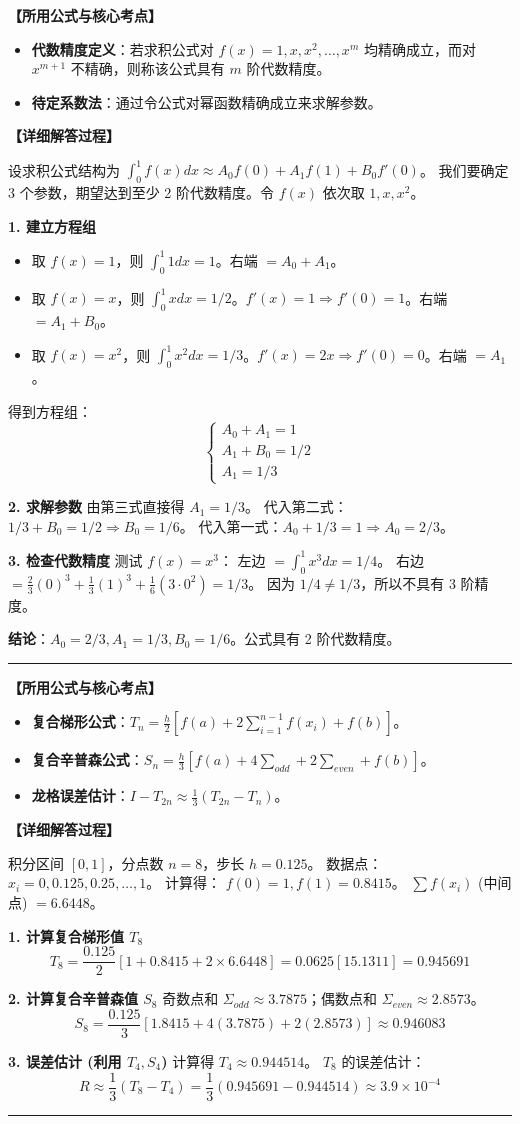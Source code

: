 \documentclass[a4paper,12pt]{ctexart}
\newcommand{\solitem}[3]{
    \vspace{1.5em}
    \begin{tcolorbox}[colback=gray!5!white, colframe=gray!50!black, title=\textbf{题目 #1}]
    \end{tcolorbox}
    
    \noindent\textbf{【所用公式与核心考点】}
    \begin{itemize}[leftmargin=2em, label=$\diamond$]
        #2
    \end{itemize}
    
    \noindent\textbf{【详细解答过程】}
    \par
    #3
    \par
    \vspace{1em}
    \hrule
}
\begin{document}
\solitem{[1]}{
    \item \textbf{代数精度定义}：若求积公式对 $f(x) = 1, x, x^2, \dots, x^m$ 均精确成立，而对 $x^{m+1}$ 不精确，则称该公式具有 $m$ 阶代数精度。
    \item \textbf{待定系数法}：通过令公式对幂函数精确成立来求解参数。
}{
    设求积公式结构为 $\int_0^1 f(x)dx \approx A_0 f(0) + A_1 f(1) + B_0 f'(0)$。
    我们要确定 3 个参数，期望达到至少 2 阶代数精度。令 $f(x)$ 依次取 $1, x, x^2$。
  
    \textbf{1. 建立方程组}
    \begin{itemize}
        \item 取 $f(x) = 1$，则 $\int_0^1 1 dx = 1$。右端 $= A_0 + A_1$。
        \item 取 $f(x) = x$，则 $\int_0^1 x dx = 1/2$。$f'(x)=1 \Rightarrow f'(0)=1$。右端 $= A_1 + B_0$。
        \item 取 $f(x) = x^2$，则 $\int_0^1 x^2 dx = 1/3$。$f'(x)=2x \Rightarrow f'(0)=0$。右端 $= A_1$。
    \end{itemize}
    得到方程组：
    \[ \begin{cases} A_0 + A_1 = 1 \\ A_1 + B_0 = 1/2 \\ A_1 = 1/3 \end{cases} \]
  
    \textbf{2. 求解参数}
    由第三式直接得 $A_1 = 1/3$。
    代入第二式：$1/3 + B_0 = 1/2 \Rightarrow B_0 = 1/6$。
    代入第一式：$A_0 + 1/3 = 1 \Rightarrow A_0 = 2/3$。
  
    \textbf{3. 检查代数精度}
    测试 $f(x) = x^3$：
    左边 $= \int_0^1 x^3 dx = 1/4$。
    右边 $= \frac{2}{3}(0)^3 + \frac{1}{3}(1)^3 + \frac{1}{6}(3 \cdot 0^2) = 1/3$。
    因为 $1/4 \neq 1/3$，所以不具有 3 阶精度。
  
    \textbf{结论}：$A_0 = 2/3, A_1 = 1/3, B_0 = 1/6$。公式具有 2 阶代数精度。
}

\solitem{[3]}{
    \item \textbf{复合梯形公式}：$T_n = \frac{h}{2} [f(a) + 2\sum_{i=1}^{n-1} f(x_i) + f(b)]$。
    \item \textbf{复合辛普森公式}：$S_n = \frac{h}{3} [f(a) + 4\sum_{odd} + 2\sum_{even} + f(b)]$。
    \item \textbf{龙格误差估计}：$I - T_{2n} \approx \frac{1}{3}(T_{2n} - T_n)$。
}{
    积分区间 $[0, 1]$，分点数 $n=8$，步长 $h = 0.125$。
    数据点：$x_i = 0, 0.125, 0.25, \dots, 1$。
    计算得：
    $f(0)=1, f(1)=0.8415$。
    $\sum f(x_i)$ (中间点) $= 6.6448$。
  
    \textbf{1. 计算复合梯形值 $T_8$}
    \[ T_8 = \frac{0.125}{2} [1 + 0.8415 + 2 \times 6.6448] = 0.0625 [15.1311] = 0.945691 \]
  
    \textbf{2. 计算复合辛普森值 $S_8$}
    奇数点和 $\Sigma_{odd} \approx 3.7875$；偶数点和 $\Sigma_{even} \approx 2.8573$。
    \[ S_8 = \frac{0.125}{3} [1.8415 + 4(3.7875) + 2(2.8573)] \approx 0.946083 \]
  
    \textbf{3. 误差估计 (利用 $T_4, S_4$)}
    计算得 $T_4 \approx 0.944514$。
    $T_8$ 的误差估计：
    \[ R \approx \frac{1}{3}(T_8 - T_4) = \frac{1}{3}(0.945691 - 0.944514) \approx 3.9 \times 10^{-4} \]
}
\end{document}

